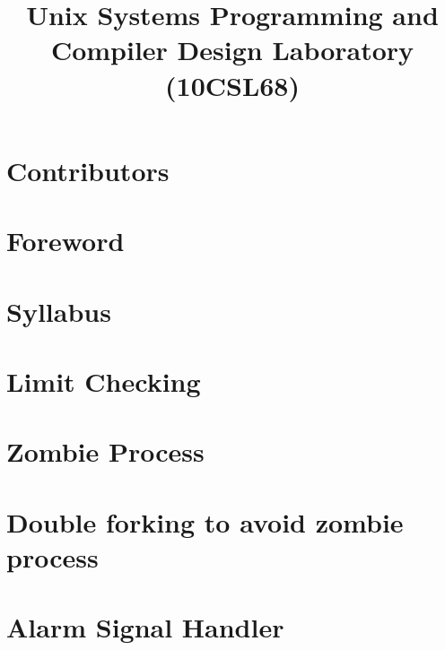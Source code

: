 \documentclass{report}
\begin{document}
\title{Unix Systems Programming and \\ Compiler Design Laboratory \\ (10CSL68)}
\maketitle

\chapter*{Contributors}


\chapter*{Foreword}


\chapter*{Syllabus}


\tableofcontents

\chapter{Limit Checking}


\chapter{Zombie Process}


\chapter{Double forking to avoid zombie process}


\chapter{Alarm Signal Handler}

\end{document}
